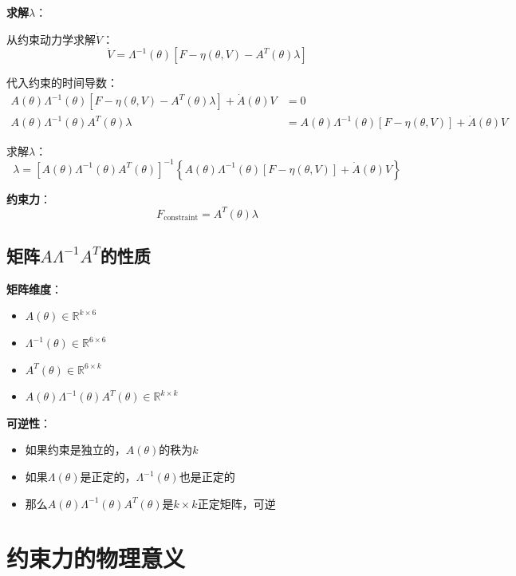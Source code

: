 \documentclass[12pt,a4paper]{article}
\begin{document}
\textbf{求解$\lambda$}：

从约束动力学求解$\dot{V}$：
\begin{equation}
\dot{V} = \Lambda^{-1}(\theta)[F - \eta(\theta, V) - A^T(\theta)\lambda]
\end{equation}

代入约束的时间导数：
\begin{align}
A(\theta)\Lambda^{-1}(\theta)[F - \eta(\theta, V) - A^T(\theta)\lambda] + \dot{A}(\theta)V &= 0 \\
A(\theta)\Lambda^{-1}(\theta)A^T(\theta)\lambda &= A(\theta)\Lambda^{-1}(\theta)[F - \eta(\theta, V)] + \dot{A}(\theta)V
\end{align}

求解$\lambda$：
\begin{equation}
\lambda = [A(\theta)\Lambda^{-1}(\theta)A^T(\theta)]^{-1}\left\{A(\theta)\Lambda^{-1}(\theta)[F - \eta(\theta, V)] + \dot{A}(\theta)V\right\}
\end{equation}

\textbf{约束力}：
\begin{equation}
F_{\text{constraint}} = A^T(\theta)\lambda
\end{equation}

\subsection{矩阵$A\Lambda^{-1}A^T$的性质}

\textbf{矩阵维度}：
\begin{itemize}
\item $A(\theta) \in \mathbb{R}^{k \times 6}$
\item $\Lambda^{-1}(\theta) \in \mathbb{R}^{6 \times 6}$
\item $A^T(\theta) \in \mathbb{R}^{6 \times k}$
\item $A(\theta)\Lambda^{-1}(\theta)A^T(\theta) \in \mathbb{R}^{k \times k}$
\end{itemize}

\textbf{可逆性}：
\begin{itemize}
\item 如果约束是独立的，$A(\theta)$的秩为$k$
\item 如果$\Lambda(\theta)$是正定的，$\Lambda^{-1}(\theta)$也是正定的
\item 那么$A(\theta)\Lambda^{-1}(\theta)A^T(\theta)$是$k \times k$正定矩阵，可逆
\end{itemize}

\section{约束力的物理意义}
\end{document}
